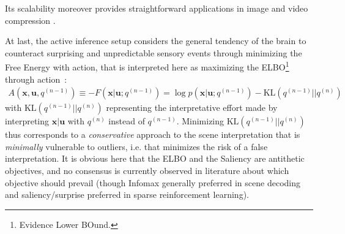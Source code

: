 \documentclass{article}
\begin{document}
Its scalability moreover provides straightforward applications in image and video compression  \cite{wang2003foveation,guo2010novel}.

At last, the  active inference setup \citep{friston2010free,friston2012perceptions} 
considers the general tendency of the brain to counteract surprising and unpredictable sensory events through minimizing the Free Energy with action, that is  interpreted here as maximizing the ELBO\footnote{Evidence Lower BOund.} through action~:
\begin{align}
A(\boldsymbol{x}, \boldsymbol{u}, q^{(n-1)}) \equiv -F(\boldsymbol{x}|\boldsymbol{u}; q^{(n-1)}) = 
\log p(\boldsymbol{x}| \boldsymbol{u}; q^{(n-1)}) - \text{KL}(q^{(n-1)}||q^{(n)})
\label{eq:ELBO}
\end{align}
with $\text{KL}(q^{(n-1)}||q^{(n)})$ representing the interpretative effort made by interpreting  $\boldsymbol{x}|\boldsymbol{u}$ with $q^{(n)}$ instead of $q^{(n-1)}$. Minimizing $\text{KL}(q^{(n-1)}||q^{(n)})$ thus corresponds to a \emph{conservative} approach to the scene interpretation
that is \emph{minimally} vulnerable to outliers, i.e. that minimizes the risk of a false interpretation. It is obvious here that the ELBO and the Saliency are antithetic objectives, and no consensus is currently observed in literature about which objective should prevail (though Infomax generally preferred in scene decoding and saliency/surprise preferred in sparse reinforcement learning).
\end{document}
